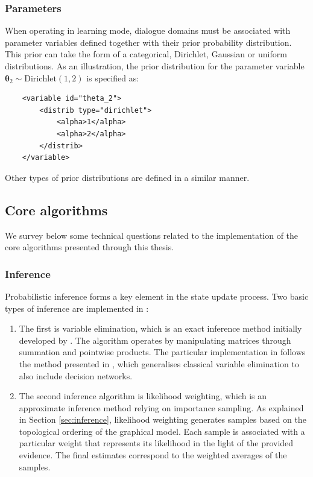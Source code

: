 \subsubsection*{Parameters}

When operating in learning mode, dialogue domains must be associated with parameter variables defined together with their prior probability distribution.  This prior can take the form of a categorical, Dirichlet, Gaussian or uniform distributions.  As an illustration, the prior distribution for the parameter variable $\boldsymbol\theta_2 \sim \mathrm{Dirichlet}(1,2)$ is specified as: 

\vspace{3mm}\begin{lstlisting}
    <variable id="theta_2">
        <distrib type="dirichlet">
            <alpha>1</alpha>
            <alpha>2</alpha>
        </distrib>
    </variable>
\end{lstlisting}\vspace{2mm}

Other types of prior distributions are defined in a similar manner. 

\subsection{Core algorithms}
\label{sec:corealgorithms}

We survey below some technical questions related to the \opendial implementation of the core algorithms presented through this thesis.  

\subsubsection*{Inference}

Probabilistic inference forms a key element in the state update process.  Two basic types of inference are implemented in \opendial: \begin{enumerate}
\item The first is variable elimination, which is an exact inference method initially developed by \cite{ZhangP96}.  The algorithm operates by manipulating matrices through summation and pointwise products. The particular implementation in \opendial follows the method presented in \cite[][p. 1101]{Koller+Friedman:09}, which generalises classical variable elimination to also include decision networks.
\item The second inference algorithm is likelihood weighting, which is an approximate inference method relying on importance sampling. As explained in Section \ref{sec:inference}, likelihood weighting generates samples based on the topological ordering of the graphical model. Each sample is associated with a particular weight that represents its likelihood in the light of the provided evidence.  The final estimates correspond to the weighted averages of the samples. 
\end{enumerate}

